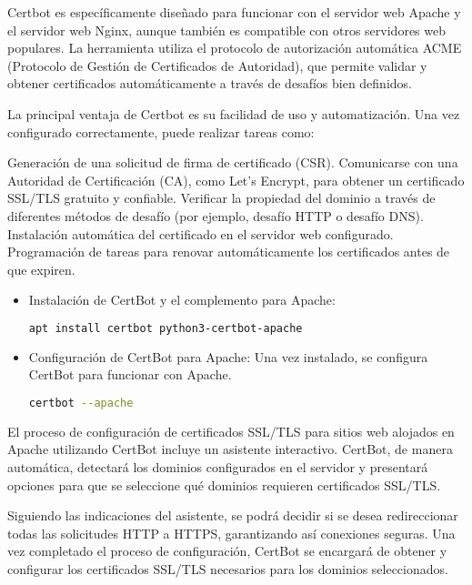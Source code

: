 \begin{enumerate}
			Certbot es específicamente diseñado para funcionar con el servidor web Apache y el servidor web Nginx, aunque también es compatible con otros servidores web populares. La herramienta utiliza el protocolo de autorización automática ACME (Protocolo de Gestión de Certificados de Autoridad), que permite validar y obtener certificados automáticamente a través de desafíos bien definidos.
			
			La principal ventaja de Certbot es su facilidad de uso y automatización. Una vez configurado correctamente, puede realizar tareas como:
			
			Generación de una solicitud de firma de certificado (CSR).
			Comunicarse con una Autoridad de Certificación (CA), como Let's Encrypt, para obtener un certificado SSL/TLS gratuito y confiable.
			Verificar la propiedad del dominio a través de diferentes métodos de desafío (por ejemplo, desafío HTTP o desafío DNS).
			Instalación automática del certificado en el servidor web configurado.
			Programación de tareas para renovar automáticamente los certificados antes de que expiren.
			
	
		\begin{itemize}
			\item Instalación de CertBot y el complemento para Apache:
			\begin{lstlisting}[language=Bash,caption=Directorio de trabajo NextCloud]
			apt install certbot python3-certbot-apache
			\end{lstlisting}
			
			\item Configuración de CertBot para Apache:	Una vez instalado, se configura CertBot para funcionar con Apache.
			
			\begin{lstlisting}[language=Bash,caption=Directorio de trabajo NextCloud]
			certbot --apache
			\end{lstlisting}
		
			\end{itemize}	
		
			El proceso de configuración de certificados SSL/TLS para sitios web alojados en Apache utilizando CertBot incluye un asistente interactivo. CertBot, de manera automática, detectará los dominios configurados en el servidor y presentará opciones para que se seleccione qué dominios requieren certificados SSL/TLS.
			
			Siguiendo las indicaciones del asistente, se podrá decidir si se desea redireccionar todas las solicitudes HTTP a HTTPS, garantizando así conexiones seguras. Una vez completado el proceso de configuración, CertBot se encargará de obtener y configurar los certificados SSL/TLS necesarios para los dominios seleccionados.
			

\end{enumerate}
